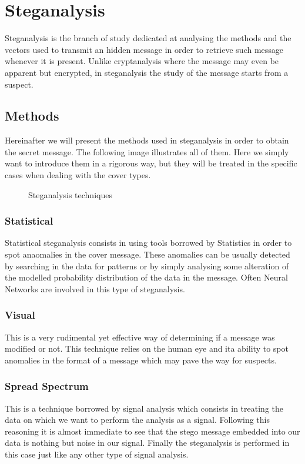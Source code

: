 \documentclass[../../main.tex]{subfiles}
\begin{document}
    
    \section{Steganalysis}
    Steganalysis is the branch of study dedicated at analysing the methods and
    the vectors used to transmit an hidden message in order to retrieve such
    message whenever it is present.
    Unlike cryptanalysis where the message may even be apparent but encrypted,
    in steganalysis the study of the message starts from a suspect.
    \subsection{Methods}
    Hereinafter we will present the methods used in steganalysis in
    order to obtain the secret message. The following image illustrates all of
    them. Here we simply want to introduce them in a rigorous way, but they will
    be treated in the specific cases when dealing with the cover types.

    \begin{figure}[h]
        \centering
        \caption{Steganalysis techniques}
    \end{figure}


    \subsubsection{Statistical}
    Statistical steganalysis consists in using tools borrowed by Statistics in
    order to spot anaomalies in the cover message. These anomalies can be
    usually detected by searching in the data for patterns or by simply
    analysing some alteration of the modelled probability distribution of the
    data in the message. Often Neural Networks are involved in this type of
    steganalysis.

    \subsubsection{Visual}
    This is a very rudimental yet effective way of determining if a message was
    modified or not. This technique relies on the human eye and ita ability to
    spot anomalies in the format of a message which may pave the way for
    suspects.
    
    \subsubsection{Spread Spectrum}
    This is a technique borrowed by signal analysis which consists in treating
    the data on which we want to perform the analysis as a signal. Following
    this reasoning it is almost immediate to see that the stego message embedded
    into our data is nothing but noise in our signal. Finally the steganalysis
    is performed in this case just like any other type of signal analysis.
\end{document}
